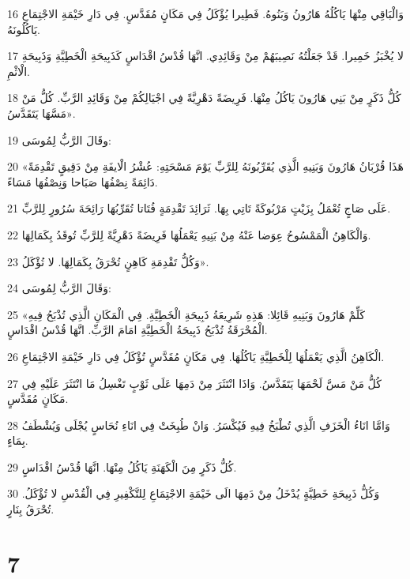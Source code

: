 \par 16 وَالْبَاقِي مِنْهَا يَاكُلُهُ هَارُونُ وَبَنُوهُ. فَطِيرا يُؤْكَلُ فِي مَكَانٍ مُقَدَّسٍ. فِي دَارِ خَيْمَةِ الاجْتِمَاعِ يَاكُلُونَهُ.
\par 17 لا يُخْبَزُ خَمِيرا. قَدْ جَعَلْتُهُ نَصِيبَهُمْ مِنْ وَقَائِدِي. انَّهَا قُدْسُ اقْدَاسٍ كَذَبِيحَةِ الْخَطِيَّةِ وَذَبِيحَةِ الْاثْمِ.
\par 18 كُلُّ ذَكَرٍ مِنْ بَنِي هَارُونَ يَاكُلُ مِنْهَا. فَرِيضَةً دَهْرِيَّةً فِي اجْيَالِكُمْ مِنْ وَقَائِدِ الرَّبِّ. كُلُّ مَنْ مَسَّهَا يَتَقَدَّسُ».
\par 19 وقَالَ الرَّبُّ لِمُوسَى:
\par 20 «هَذَا قُرْبَانُ هَارُونَ وَبَنِيهِ الَّذِي يُقَرِّبُونَهُ لِلرَّبِّ يَوْمَ مَسْحَتِهِ: عُشْرُ الْايفَةِ مِنْ دَقِيقٍ تَقْدِمَةً دَائِمَةً نِصْفُهَا صَبَاحا وَنِصْفُهَا مَسَاءً.
\par 21 عَلَى صَاجٍ تُعْمَلُ بِزَيْتٍ مَرْبُوكَةً تَاتِي بِهَا. ثَرَائِدَ تَقْدِمَةٍ فُتَاتا تُقَرِّبُهَا رَائِحَةَ سُرُورٍ لِلرَّبِّ.
\par 22 وَالْكَاهِنُ الْمَمْسُوحُ عِوَضا عَنْهُ مِنْ بَنِيهِ يَعْمَلُهَا فَرِيضَةً دَهْرِيَّةً لِلرَّبِّ تُوقَدُ بِكَمَالِهَا.
\par 23 وَكُلُّ تَقْدِمَةِ كَاهِنٍ تُحْرَقُ بِكَمَالِهَا. لا تُؤْكَلُ».
\par 24 وَقَالَ الرَّبُّ لِمُوسَى:
\par 25 «كَلِّمْ هَارُونَ وَبَنِيهِ قَائِلا: هَذِهِ شَرِيعَةُ ذَبِيحَةِ الْخَطِيَّةِ. فِي الْمَكَانِ الَّذِي تُذْبَحُ فِيهِ الْمُحْرَقَةُ تُذْبَحُ ذَبِيحَةُ الْخَطِيَّةِ امَامَ الرَّبِّ. انَّهَا قُدْسُ اقْدَاسٍ.
\par 26 الْكَاهِنُ الَّذِي يَعْمَلُهَا لِلْخَطِيَّةِ يَاكُلُهَا. فِي مَكَانٍ مُقَدَّسٍ تُؤْكَلُ فِي دَارِ خَيْمَةِ الاجْتِمَاعِ.
\par 27 كُلُّ مَنْ مَسَّ لَحْمَهَا يَتَقَدَّسُ. وَاذَا انْتَثَرَ مِنْ دَمِهَا عَلَى ثَوْبٍ تَغْسِلُ مَا انْتَثَرَ عَلَيْهِ فِي مَكَانٍ مُقَدَّسٍ.
\par 28 وَامَّا انَاءُ الْخَزَفِ الَّذِي تُطْبَخُ فِيهِ فَيُكْسَرُ. وَانْ طُبِخَتْ فِي انَاءِ نُحَاسٍ يُجْلَى وَيُشْطَفُ بِمَاءٍ.
\par 29 كُلُّ ذَكَرٍ مِنَ الْكَهَنَةِ يَاكُلُ مِنْهَا. انَّهَا قُدْسُ اقْدَاسٍ.
\par 30 وَكُلُّ ذَبِيحَةِ خَطِيَّةٍ يُدْخَلُ مِنْ دَمِهَا الَى خَيْمَةِ الاجْتِمَاعِ لِلتَّكْفِيرِ فِي الْقُدْسِ لا تُؤْكَلُ. تُحْرَقُ بِنَارٍ.

\chapter{7}

